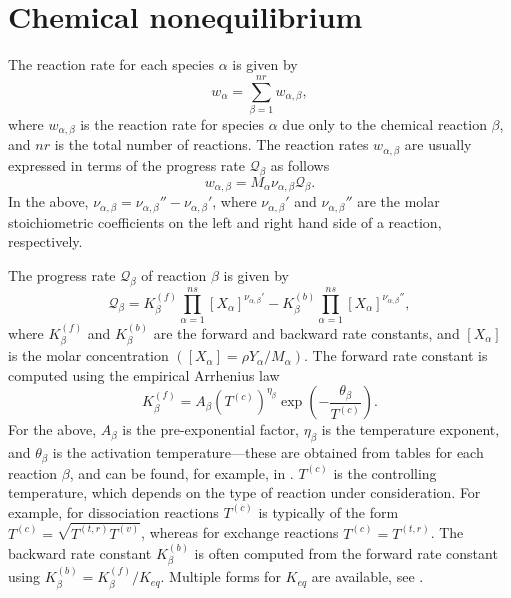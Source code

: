 \documentclass[oneside,a4paper,11pt]{report}
\begin{document}
\section{Chemical nonequilibrium}
The reaction rate for each species $\alpha$ is given by
\begin{equation}
w_\alpha = \sum_{\beta = 1}^{nr} w_{\alpha, \beta},
\end{equation}
where $w_{\alpha, \beta}$ is the reaction rate for species $\alpha$ due only to the chemical reaction $\beta$, and $nr$ is the total number of reactions. The reaction rates $w_{\alpha,\beta}$ are usually expressed in terms of the progress rate $\mathcal{Q}_\beta$ as follows
\begin{equation}
w_{\alpha,\beta} = M_\alpha \nu_{\alpha, \beta} \mathcal{Q}_\beta.
\end{equation}
In the above, $\nu_{\alpha,\beta} = \nu_{\alpha,\beta}'' - \nu_{\alpha,\beta}'$, where $\nu_{\alpha,\beta}'$ and $\nu_{\alpha,\beta}''$ are the molar stoichiometric coefficients on the left and right hand side of a reaction, respectively.

The progress rate $\mathcal{Q}_\beta$ of reaction $\beta$ is given by
\begin{equation}
\mathcal{Q}_\beta = K^{(f)}_\beta \prod_{\alpha = 1}^{ns} [ X_\alpha ]^{\nu_{\alpha, \beta}'} - K^{(b)}_\beta \prod_{\alpha = 1}^{ns} [X_\alpha]^{\nu_{\alpha, \beta}''},
\end{equation}
where $K^{(f)}_\beta$ and $K^{(b)}_\beta$ are the forward and backward rate constants, and $[X_\alpha]$ is the molar concentration $([X_\alpha] = \rho Y_\alpha / M_\alpha)$. The forward rate constant is computed using the empirical Arrhenius law
\begin{equation}
K^{(f)}_\beta = A_\beta \left ( T^{(c)} \right)^{\eta_\beta} \exp \left ( -\frac{\theta_\beta}{T^{(c)}} \right ).
\end{equation}
For the above, $A_\beta$ is the pre-exponential factor, $\eta_\beta$ is the temperature exponent, and $\theta_\beta$ is the activation temperature---these are obtained from tables for each reaction $\beta$, and can be found, for example, in \cite{park1993}. $T^{(c)}$ is the controlling temperature, which depends on the type of reaction under consideration. For example, for dissociation reactions $T^{(c)}$ is typically of the form $T^{(c)} = \sqrt{ T^{(t,r)} T^{(v)}}$, whereas for exchange reactions $T^{(c)} = T^{(t,r)}$. The backward rate constant $K^{(b)}_\beta$ is often computed from the forward rate constant using $K^{(b)}_\beta = K^{(f)}_\beta / K_{eq}$. Multiple forms for $K_{eq}$ are available, see \cite{poinsot2012,knisely2018}.
\end{document}
